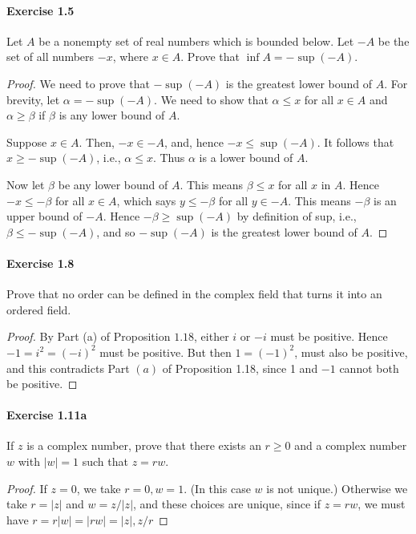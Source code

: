 \documentclass{article}
\theoremstyle{definition}
\begin{document}
\paragraph{Exercise 1.5} Let $A$ be a nonempty set of real numbers which is bounded below. Let $-A$ be the set of all numbers $-x$, where $x \in A$. Prove that $\inf A=-\sup (-A)$.
\begin{proof}
    We need to prove that $-\sup (-A)$ is the greatest lower bound of $A$. For brevity, let $\alpha=-\sup (-A)$. We need to show that $\alpha \leq x$ for all $x \in A$ and $\alpha \geq \beta$ if $\beta$ is any lower bound of $A$.

Suppose $x \in A$. Then, $-x \in-A$, and, hence $-x \leq \sup (-A)$. It follows that $x \geq-\sup (-A)$, i.e., $\alpha \leq x$. Thus $\alpha$ is a lower bound of $A$.

Now let $\beta$ be any lower bound of $A$. This means $\beta \leq x$ for all $x$ in $A$. Hence $-x \leq-\beta$ for all $x \in A$, which says $y \leq-\beta$ for all $y \in-A$. This means $-\beta$ is an upper bound of $-A$. Hence $-\beta \geq \sup (-A)$ by definition of sup, i.e., $\beta \leq-\sup (-A)$, and so $-\sup (-A)$ is the greatest lower bound of $A$.
\end{proof}



\paragraph{Exercise 1.8} Prove that no order can be defined in the complex field that turns it into an ordered field.
\begin{proof}
    By Part (a) of Proposition $1.18$, either $i$ or $-i$ must be positive. Hence $-1=i^2=(-i)^2$ must be positive. But then $1=(-1)^2$, must also be positive, and this contradicts Part $(a)$ of Proposition 1.18, since 1 and $-1$ cannot both be positive.
\end{proof}



\paragraph{Exercise 1.11a} If $z$ is a complex number, prove that there exists an $r\geq 0$ and a complex number $w$ with $| w | = 1$ such that $z = rw$.
\begin{proof}
    If $z=0$, we take $r=0, w=1$. (In this case $w$ is not unique.) Otherwise we take $r=|z|$ and $w=z /|z|$, and these choices are unique, since if $z=r w$, we must have $r=r|w|=|r w|=|z|, z / r$
\end{proof}
\end{document}
